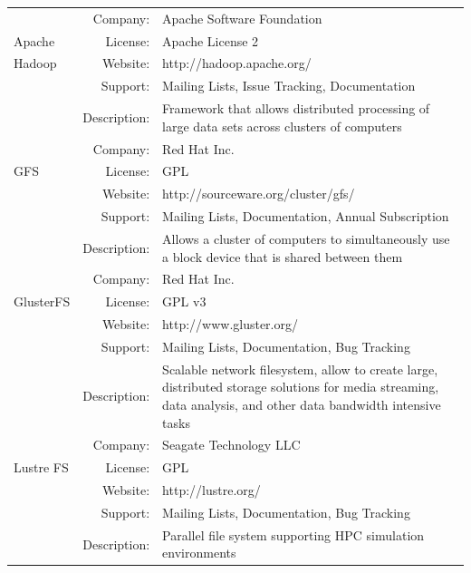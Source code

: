 \documentclass[a4paper, 12pt]{book}
\begin{document}
\begin{table}[H]
  \centering
  \begin{tabular}{ | m{2cm} | r  m{10cm} | }

  \hline        
		& Company: & Apache Software Foundation \\
     Apache	& License: & Apache License 2 \\
     Hadoop	& Website: & http://hadoop.apache.org/ \\
		& Support: & Mailing Lists, Issue Tracking, Documentation \\
	 	& Description: & Framework that allows distributed processing of large data sets across clusters of computers \\
    \hline        
		& Company: & Red Hat Inc. \\
      GFS	& License: & GPL \\
		& Website: & http://sourceware.org/cluster/gfs/ \\
		& Support: & Mailing Lists, Documentation, Annual Subscription \\
	 	& Description: & Allows a cluster of computers to simultaneously use a block device that is shared between them \\
    \hline
		& Company: & Red Hat Inc. \\
      GlusterFS & License: & GPL v3 \\
		& Website: & http://www.gluster.org/ \\
		& Support: & Mailing Lists, Documentation, Bug Tracking \\
	 	& Description: & Scalable network filesystem, allow to create large, distributed storage solutions for media streaming, data analysis, and other data bandwidth intensive tasks \\
    \hline
		& Company: & Seagate Technology LLC \\
      Lustre FS	& License: & GPL \\
		& Website: & http://lustre.org/ \\
		& Support: & Mailing Lists, Documentation, Bug Tracking \\
	 	& Description: & Parallel file system supporting HPC simulation environments \\


\end{tabular}
\end{table}
\end{document}
